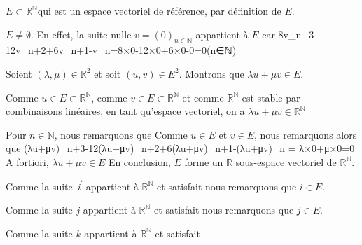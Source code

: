 \startList
\item%
\startList%
\item%
\startitemize[1]
\item $E⊂ℝ^ℕ$qui est un espace vectoriel de référence, par définition de $E$.
\item $E≠\emptyset$. En effet, la suite nulle $v=(0)_{n∈ℕ}$ appartient à $E$ car 
\startformula
8v_{n+3}-12v_{n+2}+6v_{n+1}-v_n=8×0-12×0+6×0-0=0\qquad(n∈ℕ)
\stopformula
\item Soient $(λ,μ)∈ℝ^2$ et soit $(u,v)∈E^2$. Montrons que $λu+μv∈E$.
\startitemize[2]
\item Comme $u∈E⊂ℝ^ℕ$,  comme $v∈E⊂ℝ^ℕ$ et comme $ℝ^ℕ$ est stable par combinaisons linéaires, en tant qu'espace vectoriel, 
on a $λu+μv∈ℝ^ℕ$
\item Pour $n∈ℕ$, nous remarquons que 
\startformula
{}
\stopformula
Comme $u∈E$ et $v∈E$, nous remarquons alors que 
(λu+μv)_{n+3}-12(λu+μv)_{n+2}+6(λu+μv)_{n+1}-(λu+μv)_n
= λ×0+μ×0=0
\stopformula
\stopitemize%
A fortiori, $λu+μv∈E$
\stopitemize%
En conclusion, $E$ forme un $ℝ$ sous-espace vectoriel de $ℝ^ℕ$.
\item%
\startList
\item%
\startitemize[1]%
\item Comme la suite $\vec i$ appartient à $ℝ^ℕ$ et satisfait 
\startformula
{}
\stopformula
nous remarquons que $i∈E$.
\item Comme la suite $j$ appartient à $ℝ^ℕ$ et satisfait 
\startformula
{}
\stopformula
nous remarquons que $j∈E$.
\item Comme la suite $k$ appartient à $ℝ^ℕ$ et satisfait 
\startformula
{}
